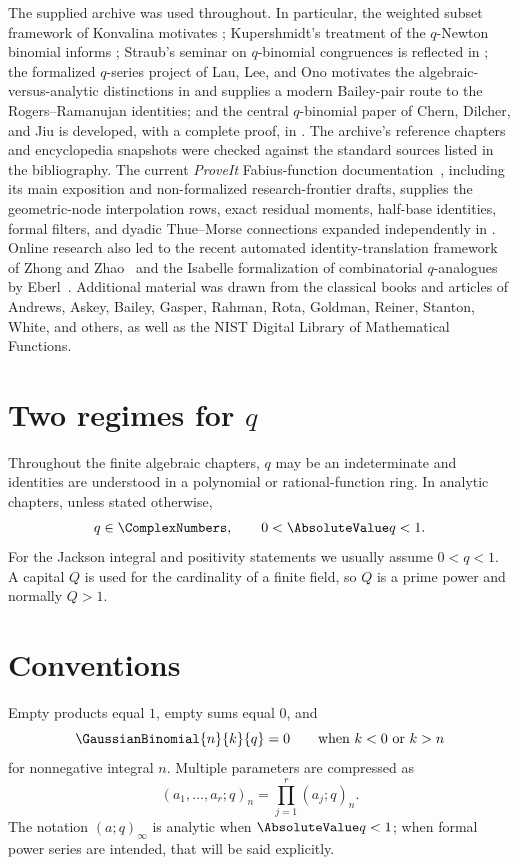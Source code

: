 \documentclass[11pt,a4paper,oneside,openany]{book}
\theoremstyle{definition}
\theoremstyle{remark}
\begin{document}
The supplied archive was used throughout.  In particular, the weighted subset framework of Konvalina motivates ; Kupershmidt's treatment of the $q$-Newton binomial informs ; Straub's seminar on $q$-binomial congruences is reflected in ; the formalized $q$-series project of Lau, Lee, and Ono motivates the algebraic-versus-analytic distinctions in  and supplies a modern Bailey-pair route to the Rogers--Ramanujan identities; and the central $q$-binomial paper of Chern, Dilcher, and Jiu is developed, with a complete proof, in .  The archive's reference chapters and encyclopedia snapshots were checked against the standard sources listed in the bibliography.  The current \emph{ProveIt} Fabius-function documentation~\cite{ReshetnikovProveIt2026}, including its main exposition and non-formalized research-frontier drafts, supplies the geometric-node interpolation rows, exact residual moments, half-base identities, formal filters, and dyadic Thue--Morse connections expanded independently in .  Online research also led to the recent automated identity-translation framework of Zhong and Zhao~\cite{ZhongZhao2026} and the Isabelle formalization of combinatorial $q$-analogues by Eberl~\cite{Eberl2024QAnalogues}.  Additional material was drawn from the classical books and articles of Andrews, Askey, Bailey, Gasper, Rahman, Rota, Goldman, Reiner, Stanton, White, and others, as well as the NIST Digital Library of Mathematical Functions.

\section*{Two regimes for $q$}
Throughout the finite algebraic chapters, $q$ may be an indeterminate and identities are understood in a polynomial or rational-function ring.  In analytic chapters, unless stated otherwise,
\[
  q\in\ComplexNumbers,\qquad 0<\AbsoluteValue q<1.
\]
For the Jackson integral and positivity statements we usually assume $0<q<1$.  A capital $Q$ is used for the cardinality of a finite field, so $Q$ is a prime power and normally $Q>1$.

\section*{Conventions}
Empty products equal $1$, empty sums equal $0$, and
\[
 \GaussianBinomial{n}{k}{q}=0\qquad\text{when }k<0\text{ or }k>n
\]
for nonnegative integral $n$.  Multiple parameters are compressed as
\[
 (a_1,\ldots,a_r;q)_n=\prod_{j=1}^r(a_j;q)_n.
\]
The notation $(a;q)_\infty$ is analytic when $\AbsoluteValue q<1$; when formal power series are intended, that will be said explicitly.
\end{document}
